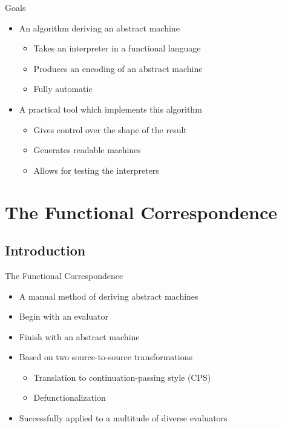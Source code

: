 \documentclass{beamer}
\begin{document}
\begin{frame}{Goals}
  \begin{itemize}
    \item An algorithm deriving an abstract machine
    \begin{itemize}
      \item Takes an interpreter in a functional language
      \item Produces an encoding of an abstract machine
      \item Fully automatic
    \end{itemize}
    \item A practical tool which implements this algorithm
    \begin{itemize}
      \item Gives control over the shape of the result
      \item Generates readable machines
      \item Allows for testing the interpreters
    \end{itemize}
  \end{itemize}
\end{frame}

\section{The Functional Correspondence}
\subsection{Introduction}

\begin{frame}{The Functional Correspondence}
  \begin{itemize}
    \item A manual method of deriving abstract machines
    \item Begin with an evaluator
    \item Finish with an abstract machine
    \item Based on two source-to-source transformations
    \begin{itemize}
      \item Translation to continuation-passing style (CPS)
      \item Defunctionalization
    \end{itemize}
    \item Successfully applied to a multitude of diverse evaluators
  \end{itemize}
\end{frame}
\end{document}
